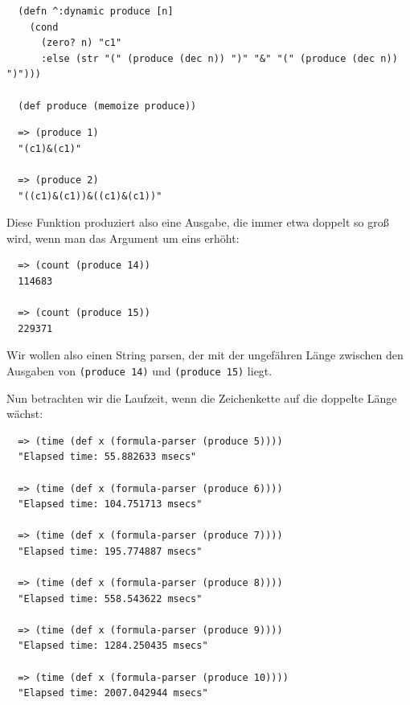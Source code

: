 \documentclass[ngerman,a4paper,abstracton,open=right,twoside=false,toc=listofnumbered,bibtotocnumbered]{scrreprt}
\begin{document}
\begin{lstlisting}
  (defn ^:dynamic produce [n]
    (cond
      (zero? n) "c1"
      :else (str "(" (produce (dec n)) ")" "&" "(" (produce (dec n)) ")")))

  (def produce (memoize produce))
\end{lstlisting}

\begin{lstlisting}
  => (produce 1)
  "(c1)&(c1)"

  => (produce 2)
  "((c1)&(c1))&((c1)&(c1))"
\end{lstlisting}

Diese Funktion produziert also eine Ausgabe, die immer etwa doppelt so groß wird, wenn man das Argument um eins erhöht:

\begin{lstlisting}
  => (count (produce 14))
  114683

  => (count (produce 15))
  229371
\end{lstlisting}

Wir wollen also einen String parsen, der mit der ungefähren Länge zwischen den Ausgaben von \lstinline|(produce 14)| und \lstinline|(produce 15)| liegt.

Nun betrachten wir die Laufzeit, wenn die Zeichenkette auf die doppelte Länge wächst:

\begin{lstlisting}
  => (time (def x (formula-parser (produce 5))))
  "Elapsed time: 55.882633 msecs"

  => (time (def x (formula-parser (produce 6))))
  "Elapsed time: 104.751713 msecs"

  => (time (def x (formula-parser (produce 7))))
  "Elapsed time: 195.774887 msecs"

  => (time (def x (formula-parser (produce 8))))
  "Elapsed time: 558.543622 msecs"

  => (time (def x (formula-parser (produce 9))))
  "Elapsed time: 1284.250435 msecs"

  => (time (def x (formula-parser (produce 10))))
  "Elapsed time: 2007.042944 msecs"
\end{lstlisting}


\appendix
\end{document}
